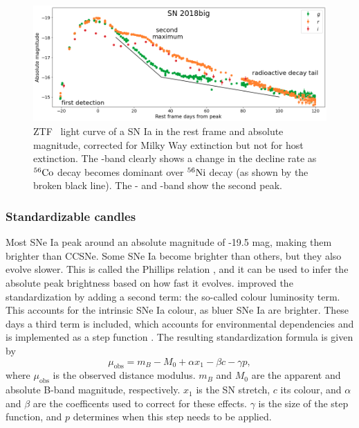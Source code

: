 \documentclass[a4paper,oneside,12pt, class=Latex/Classes/PhDthesisPSnPDF, crop=false]{standalone}
\begin{document}
\begin{figure}
    \centering
    \includegraphics[width=\textwidth]{../Images/chapter_1/Ia-norm_example.png}
    \caption{ZTF \ztfg\ztfr\ztfi\ light curve of a SN Ia in the rest frame and absolute magnitude, corrected for Milky Way extinction but not for host extinction. The \ztfg-band clearly shows a change in the decline rate as $^{56}\text{Co}$ decay becomes dominant over $^{56}\text{Ni}$ decay (as shown by the broken black line). The \ztfr- and \ztfi-band show the second peak.}
    \label{Ia-norm_example}
\end{figure}

\subsubsection{Standardizable candles}
\label{Standard_candle}
Most SNe Ia peak around an absolute magnitude of -19.5 mag, making them brighter than CCSNe. Some SNe Ia become brighter than others, but they also evolve slower. This is called the Phillips relation \citep{phillips_rel}, and it can be used to infer the absolute peak brightness based on how fast it evolves. \citet{Tripp_colour_rel} improved the standardization by adding a second term: the so-called colour luminosity term. This accounts for the intrinsic SNe Ia colour, as bluer SNe Ia are brighter. These days a third term is included, which accounts for environmental dependencies and is implemented as a step function \citep{Kelly_mass_step, Sullivan_mass_step}. The resulting standardization formula is given by
\begin{equation}
    \mu_\text{obs} = m_B - M_0 + \alpha x_1 - \beta c - \gamma p,
\end{equation}
where $\mu_\text{obs}$ is the observed distance modulus. $m_B$ and $M_0$ are the apparent and absolute B-band magnitude, respectively. $x_1$ is the SN stretch, $c$ its colour, and $\alpha$ and $\beta$ are the coefficents used to correct for these effects. $\gamma$ is the size of the step function, and $p$ determines when this step needs to be applied.
\end{document}
